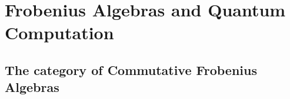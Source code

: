\chapter{Frobenius Algebras and Quantum Computation} %
\label{cha:frobenius_algebras_and_quantum_computation}
\section{The category of Commutative Frobenius Algebras} %
\label{sec:the_category_of_commutative_frobenius_algebras}

